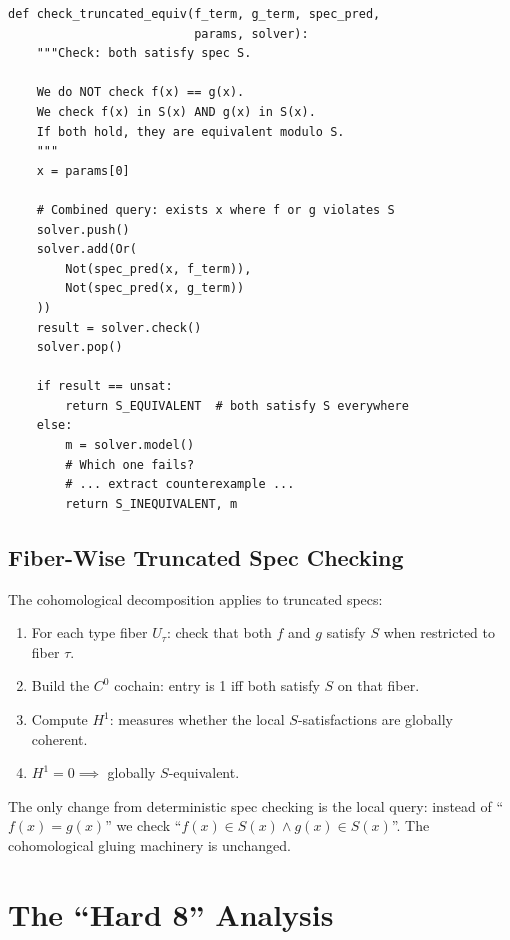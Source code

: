 \documentclass[11pt,a4paper]{report}
\theoremstyle{definition}
\theoremstyle{plain}
\newcommand{\Hone}{H^1}
\begin{document}
\begin{lstlisting}[caption={Truncated spec check}]
def check_truncated_equiv(f_term, g_term, spec_pred,
                          params, solver):
    """Check: both satisfy spec S.

    We do NOT check f(x) == g(x).
    We check f(x) in S(x) AND g(x) in S(x).
    If both hold, they are equivalent modulo S.
    """
    x = params[0]

    # Combined query: exists x where f or g violates S
    solver.push()
    solver.add(Or(
        Not(spec_pred(x, f_term)),
        Not(spec_pred(x, g_term))
    ))
    result = solver.check()
    solver.pop()

    if result == unsat:
        return S_EQUIVALENT  # both satisfy S everywhere
    else:
        m = solver.model()
        # Which one fails?
        # ... extract counterexample ...
        return S_INEQUIVALENT, m
\end{lstlisting}

\subsection{Fiber-Wise Truncated Spec Checking}

The cohomological decomposition applies to truncated specs:

\begin{enumerate}
  \item For each type fiber $U_\tau$: check that both $f$ and $g$
    satisfy $S$ when restricted to fiber $\tau$.
  \item Build the $C^0$ cochain: entry is 1 iff both satisfy $S$
    on that fiber.
  \item Compute $\Hone$: measures whether the local $S$-satisfactions
    are globally coherent.
  \item $\Hone = 0 \implies$ globally $S$-equivalent.
\end{enumerate}

The only change from deterministic spec checking is the local query:
instead of ``$f(x) = g(x)$'' we check ``$f(x) \in S(x) \land
g(x) \in S(x)$''.  The cohomological gluing machinery is unchanged.


\section{The ``Hard 8'' Analysis}
\label{sec:hard-8}
\end{document}
